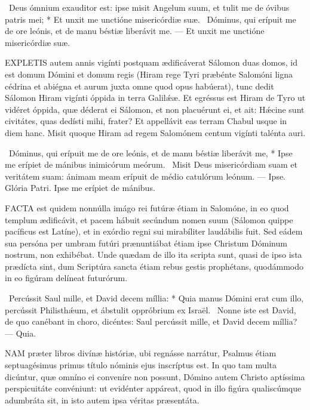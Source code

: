 \R\ Deus ómnium exauditor est: ipse misit Angelum suum, et tulit me de óvibus patris mei; * Et unxit me unctióne misericórdiæ suæ. \V\ Dóminus, qui erípuit me de ore leónis, et de manu béstiæ liberávit me. --- Et unxit me unctióne misericórdiæ suæ.


\lettrine[lines=2]{E}{XPLETIS} autem annis vigínti postquam ædificáverat Sálomon duas domos, id est domum Dómini et domum regis (Hiram rege Tyri præbénte Salomóni ligna cédrina et abiégna et aurum juxta omne quod opus habúerat), tunc dedit Sálomon Hiram vigínti óppida in terra Galilǽæ. Et egréssus est Hiram de Tyro ut vidéret óppida, quæ déderat ei Sálomon, et non placuérunt ei, et ait: Hǽcine sunt civitátes, quas dedísti mihi, frater? Et appellávit eas terram Chabul usque in diem hanc. Misit quoque Hiram ad regem Salomónem centum vigínti talénta auri.

\R\ Dóminus, qui erípuit me de ore leónis, et de manu béstiæ liberávit me, * Ipse me erípiet de mánibus inimicórum meórum. \V\ Misit Deus misericórdiam suam et veritátem suam: ánimam meam erípuit de médio catulórum leónum. --- Ipse. Glória Patri. Ipse me erípiet de mánibus.





\lettrine[lines=2]{F}{ACTA} est quidem nonnúlla imágo rei futúræ étiam in Salomóne, in eo quod templum ædificávit, et pacem hábuit secúndum nomen suum (Sálomon quippe pacíficus est Latíne), et in exórdio regni sui mirabíliter laudábilis fuit. Sed eádem sua persóna per umbram futúri prænuntiábat étiam ipse Christum Dóminum nostrum, non exhibébat. Unde quædam de illo ita scripta sunt, quasi de ipso ista prædícta sint, dum Scriptúra sancta étiam rebus gestis prophétans, quodámmodo in eo figúram delíneat futurórum.

\R\ Percússit Saul mille, et David decem míllia: * Quia manus Dómini erat cum illo, percússit Philisthǽum, et ábstulit oppróbrium ex Israël. \V\ Nonne iste est David, de quo canébant in choro, dicéntes: Saul percússit mille, et David decem míllia? --- Quia.


\lettrine[lines=2]{N}{AM} præter libros divínæ históriæ, ubi regnásse narrátur, Psalmus étiam septuagésimus primus título nóminis ejus inscríptus est. In quo tam multa dicúntur, quæ omníno ei conveníre non possunt, Dómino autem Christo aptíssima perspicuitáte convéniunt: ut evidénter appáreat, quod in illo figúra qualiscúmque adumbráta sit, in isto autem ipsa véritas præsentáta.

